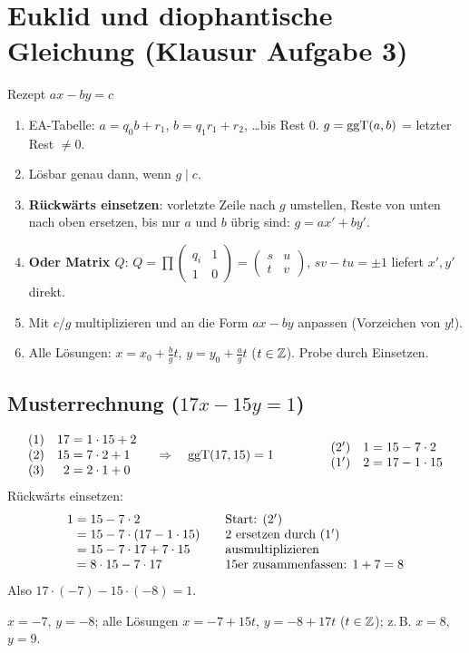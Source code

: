 \section{Euklid und diophantische Gleichung (Klausur Aufgabe 3)}
\begin{rezept}{Rezept $ax - by = c$}
\begin{enumerate}
\item EA-Tabelle: $a = q_0 b + r_1$, $b = q_1 r_1 + r_2$, \dots bis Rest 0. $g = \operatorname{ggT}(a, b)$ = letzter Rest $\ne 0$.
\item Lösbar genau dann, wenn $g \mid c$.
\item \textbf{Rückwärts einsetzen}: vorletzte Zeile nach $g$ umstellen, Reste von unten nach oben ersetzen, bis nur $a$ und $b$ übrig sind:
      $g = a x' + b y'$.
\item \textbf{Oder Matrix $Q$}: $Q = \prod \begin{pmatrix} q_i & 1\\ 1 & 0\end{pmatrix} = \begin{pmatrix} s & u\\ t & v\end{pmatrix}$,
      $sv - tu = \pm 1$ liefert $x', y'$ direkt.
\item Mit $c/g$ multiplizieren und an die Form $ax - by$ anpassen (Vorzeichen von $y$!).
\item Alle Lösungen: $x = x_0 + \frac{b}{g} t$, $y = y_0 + \frac{a}{g} t$ ($t \in \mathbb{Z}$). \quad Probe durch Einsetzen.
\end{enumerate}
\end{rezept}

\subsection*{Musterrechnung ($17x - 15y = 1$)}
\[
\begin{array}{lr@{\;=\;}l}
(1) & 17 & 1 \cdot 15 + 2\\
(2) & 15 & 7 \cdot 2 + 1\\
(3) & 2 & 2 \cdot 1 + 0
\end{array}
\quad\Rightarrow\quad \ggT(17, 15) = 1
\qquad\qquad
\begin{array}{lr@{\;=\;}l}
(2') & 1 & 15 - 7 \cdot 2\\
(1') & 2 & 17 - 1 \cdot 15
\end{array}
\]
Rückwärts einsetzen:
\[
\begin{array}{r@{\;}l@{\qquad}l}
1 &= 15 - 7 \cdot 2 & \text{Start: } (2')\\
  &= 15 - 7 \cdot (17 - 1 \cdot 15) & 2 \text{ ersetzen durch } (1')\\
  &= 15 - 7 \cdot 17 + 7 \cdot 15 & \text{ausmultiplizieren}\\
  &= 8 \cdot 15 - 7 \cdot 17 & 15\text{er zusammenfassen: } 1 + 7 = 8
\end{array}
\]
Also $17 \cdot (-7) - 15 \cdot (-8) = 1$.
\begin{ergebnis} $x = -7$, $y = -8$; alle Lösungen $x = -7 + 15t$, $y = -8 + 17t$ ($t \in \mathbb{Z}$); z.\,B. $x = 8$, $y = 9$. \end{ergebnis}

